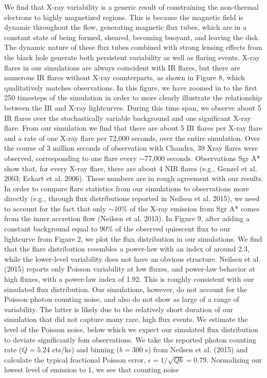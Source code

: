 We find that X-ray variability is a generic result of constraining the non-thermal electrons to highly magnetized regions. This is because the magnetic field is
dynamic throughout the flow, generating magnetic flux tubes, which are in a constant state of being formed, sheared, becoming buoyant, and leaving the disk. The
dynamic nature of these flux tubes combined with strong lensing effects from the black hole generate both persistent variability as well as flaring events.
X-ray flares in our simulations are always coincident with IR flares, but there are numerous IR flares without
X-ray counterparts, as shown in Figure 8, which qualitatively matches observations. In this figure, we have zoomed in to the first 250 timesteps of the simulation in order to more clearly illustrate the relationship between the IR and X-ray lightcurves. During this time span,
we observe about 5 IR flares over the stochastically variable background and one significant X-ray flare. From our simulation we find that there are about 5 IR flares per X-ray flare and a rate of one X-ray flare per 72,000 seconds, over the entire simulation. Over the course of
3 million seconds of observation with Chandra, 39 Xray flares were observed, corresponding to one flare every $\sim$77,000 seconds. Observations Sgr A* show that,
for every X-ray flare, there are about 4 NIR flares (e.g., Genzel et al. 2003; Eckart et al. 2006). These numbers
are in rough agreement with our results. In order to compare flare statistics from our simulations to observations more directly (e.g., through flux
distributions reported in Neilsen et al. 2015), we need to account for the fact that only  $\sim 10\%$ of the X-ray
emission from Sgr A* comes from the inner accretion flow (Neilsen et al. 2013). In Figure 9, after adding a
constant background equal to 90\% of the observed quiescent flux to our lightcurve from Figure 2, we plot the
flux distribution in our simulations. We find that the flare distribution resembles a power-law with an index of
around 2.3, while the lower-level variability does not have an obvious structure. Neilsen et al. (2015) reports only
Poisson variability at low fluxes, and power-law behavior at high fluxes, with a power-law index of 1.92. This is
roughly consistent with our simulated flux distribution. Our simulations, however, do not account for the Poisson photon counting noise, and also do not show as large of a range of variability. The latter is likely due to the
relatively short duration of our simulation that did not capture many rare, high flux events.
We estimate the level of the Poisson noise, below which we expect our simulated flux distribution to deviate significantly fom observations. We take the reported photon counting rate ($Q = 5.24$ cts/ks) and binning ($b = 300$ s) from Neilsen et al. (2015) and calculate the typical fractional Poisson error, $\epsilon=1/\sqrt{Qb}=0.79$. Normalizing our lowest level of emission to 1, we see that counting noise

